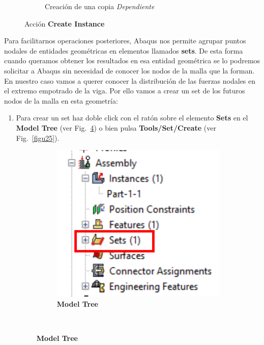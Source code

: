\begin{figure}[H]
\begin{subfigure}{0.42\textwidth}
    \caption{Creación de una copia \textit{Dependiente}}
    \label{figu23}
  \end{subfigure}%
  \caption{Acción \textbf{Create Instance}}
\end{figure}

Para facilitarnos operaciones posteriores, Abaqus nos permite agrupar
puntos nodales de entidades geométricas en elementos llamados
\textbf{sets}. De esta forma cuando queramos obtener los resultados en
esa entidad geométrica se lo podremos solicitar a Abaqus sin necesidad
de conocer los nodos de la malla que la forman. En nuestro caso vamos
a querer conocer la distribución de las fuerzas nodales en el extremo
empotrado de la viga. Por ello vamos a crear un set de los futuros
nodos de la malla en esta geometría:
\begin{enumerate}
\item Para crear un set haz doble click con el ratón sobre el elemento
  \textbf{Sets} en el \textbf{Model Tree} (ver Fig.~\ref{figu24}) o
  bien pulsa \textbf{Tools/Set/Create} (ver Fig.~\ref{figu25}).
  \begin{figure}[H]
    \centering
    \begin{subfigure}{0.35\textwidth}
      \includegraphics[width=\textwidth]{./body/images/imagen24.pdf}
      \caption{\textbf{Model Tree}}
      \label{figu24}
    \end{subfigure}%
    ~ %

\end{figure}
\end{enumerate}

